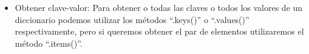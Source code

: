 \begin{itemize}
    \item  Obtener clave-valor: Para obtener o todas las claves o todos los valores de un diccionario podemos utilizar los métodos ``.keys()'' o ``.values()'' respectivamente, pero si queremos obtener el par de elementos utilizaremos el método ``.items()''.
    \begin{figure}[h]
        \centering
      \end{figure}

\end{itemize}